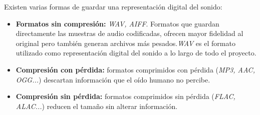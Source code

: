 Existen varias formas de guardar una representación digital del sonido:

\begin{itemize}
    \item \textbf{Formatos sin compresión:} \textit{WAV, AIFF}. Formatos que guardan directamente las muestras de audio codificadas, ofrecen mayor fidelidad al original pero también generan archivos más pesados.\textit{WAV} es el formato utilizado como representación digital del sonido a lo largo de todo el proyecto.
    \item \textbf{Compresión con pérdida:} formatos comprimidos con pérdida (\textit{MP3, AAC, OGG...}) descartan información que el oído humano no percibe.
    \item \textbf{Compresión sin pérdida:} formatos comprimidos sin pérdida (\textit{FLAC, ALAC...}) reducen el tamaño sin alterar información.
\end{itemize}
